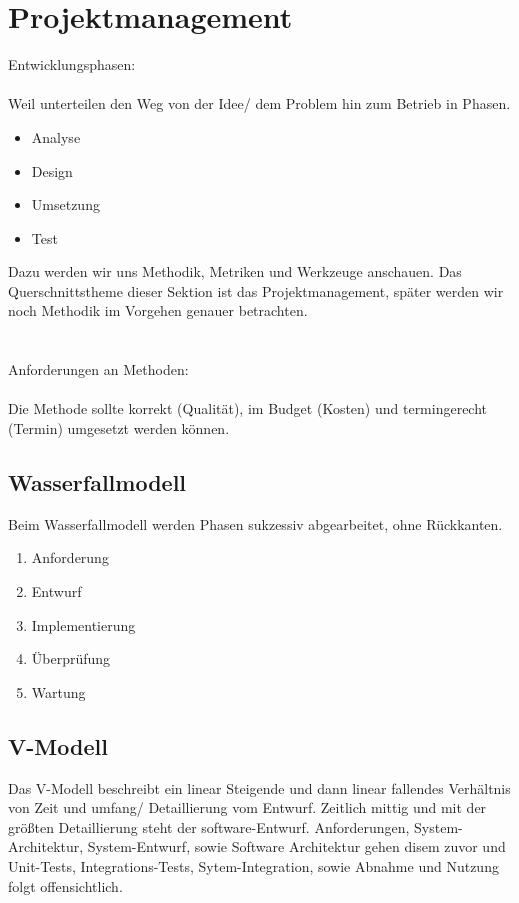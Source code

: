 \section{Projektmanagement}

Entwicklungsphasen:\\
\\
Weil unterteilen den Weg von der Idee/ dem Problem hin zum Betrieb in Phasen.

\begin{itemize}
    \item Analyse
    \item Design
    \item Umsetzung
    \item Test
\end{itemize}

Dazu werden wir uns Methodik, Metriken und Werkzeuge anschauen.
Das Querschnittstheme dieser Sektion ist das Projektmanagement, später werden wir noch Methodik im Vorgehen genauer 
betrachten.\\
\\ \\
Anforderungen an Methoden:\\
\\
Die Methode sollte korrekt (Qualität), im Budget (Kosten) und termingerecht (Termin) umgesetzt werden können.

\subsection{Wasserfallmodell}

Beim Wasserfallmodell werden Phasen sukzessiv abgearbeitet, ohne Rückkanten.
\begin{enumerate}
    \item Anforderung
    \item Entwurf
    \item Implementierung
    \item Überprüfung
    \item Wartung
\end{enumerate}

\subsection{V-Modell}

Das V-Modell beschreibt ein linear Steigende und dann linear fallendes Verhältnis von Zeit und umfang/ Detaillierung vom
Entwurf.
Zeitlich mittig und mit der größten Detaillierung steht der software-Entwurf.
Anforderungen, System-Architektur, System-Entwurf, sowie Software Architektur gehen disem zuvor und
Unit-Tests, Integrations-Tests, Sytem-Integration, sowie Abnahme und Nutzung folgt offensichtlich.

